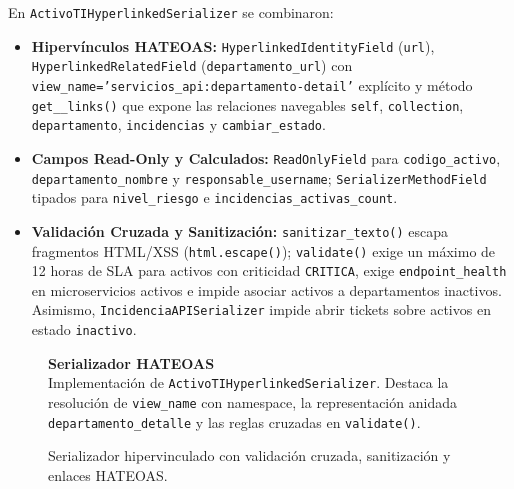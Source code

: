 \documentclass[10pt,a4paper]{article}
\begin{document}
En \texttt{ActivoTIHyperlinkedSerializer} se combinaron:
\begin{itemize}
    \item \textbf{Hipervínculos HATEOAS:} \texttt{HyperlinkedIdentityField} (\texttt{url}), \texttt{HyperlinkedRelatedField} (\texttt{departamento\_url}) con \texttt{view\_name='servicios\_api:departamento-detail'} explícito y método \texttt{get\_\_links()} que expone las relaciones navegables \texttt{self}, \texttt{collection}, \texttt{departamento}, \texttt{incidencias} y \texttt{cambiar\_estado}.
    \item \textbf{Campos Read-Only y Calculados:} \texttt{ReadOnlyField} para \texttt{codigo\_activo}, \texttt{departamento\_nombre} y \texttt{responsable\_\-username}; \texttt{SerializerMethodField} tipados para \texttt{nivel\_riesgo} e \texttt{incidencias\_activas\_count}.
    \item \textbf{Validación Cruzada y Sanitización:} \texttt{sanitizar\_texto()} escapa fragmentos HTML/XSS (\texttt{html.escape()}); \texttt{validate()} exige un máximo de 12 horas de SLA para activos con criticidad \texttt{CRITICA}, exige \texttt{endpoint\_health} en microservicios activos e impide asociar activos a departamentos inactivos. Asimismo, \texttt{IncidenciaAPISerializer} impide abrir tickets sobre activos en estado \texttt{inactivo}.
\end{itemize}

\begin{figure}[H]
\centering
\begin{minipage}[c]{0.73\textwidth}
    \centering
\end{minipage}\hfill
\begin{minipage}[c]{0.24\textwidth}
    \raggedright
    \textbf{\color{uncpnavy}\small Serializador HATEOAS}\\[4pt]
    \footnotesize
    \color{uncpdark}
    Implementación de \texttt{ActivoTIHyperlinkedSerializer}. Destaca la resolución de \texttt{view\_name} con namespace, la representación anidada \texttt{departamento\_detalle} y las reglas cruzadas en \texttt{validate()}.
\end{minipage}
\vspace{-0.2cm}
\caption{Serializador hipervinculado con validación cruzada, sanitización y enlaces HATEOAS.}
\label{fig:codesnap_serializers}
\end{figure}
\end{document}
